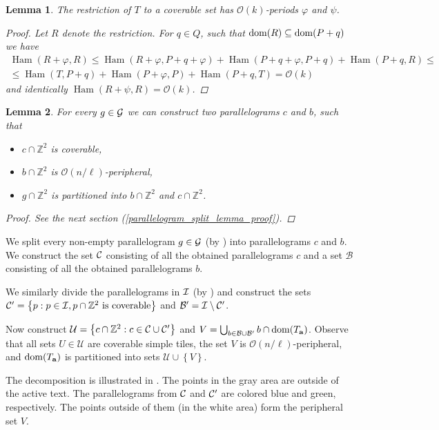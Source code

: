 \documentclass[11pt, letterpaper]{article}
\theoremstyle{plain}
\newtheorem{lemma}{Lemma}
\theoremstyle{definition}
\theoremstyle{remark}
\newcommand{\Z}{\mathbb{Z}}
\renewcommand{\O}{\mathcal{O}}
\newcommand{\U}{\mathcal{U}}
\renewcommand{\phi}{\varphi}
\newcommand{\set}[1]{\left\lbrace #1 \right\rbrace}
\newcommand{\eq}[1]{\begin{align*} #1 \end{align*}}
\DeclareMathOperator*{\Ham}{Ham}
\begin{document}
\begin{lemma}\label{coverable is periodic}
	The restriction of $T$ to a coverable set has $\O(k)$-periods $\phi$ and $\psi$.
	\begin{proof}
		Let $R$ denote the restriction. For $q \in Q$, such that $\operatorname*{dom}(R) \subseteq \operatorname*{dom}(P + q)$ we have
		\eq{
			\Ham(R + \phi, R) \le \Ham(R + \phi, P + q + \phi) + \Ham(P + q + \phi, P + q) + \Ham(P + q, R) \le \\
			\le \Ham(T, P + q) + \Ham(P + \phi, P) + \Ham(P + q, T) = \O(k)
		}
		and identically $\Ham(R + \psi, R) = \O(k)$.
	\end{proof}
\end{lemma}

\begin{lemma}\label{parallelogram_split_lemma}
	For every $g \in \mathcal{G}$ we can construct two parallelograms $c$ and $b$, such that
	\begin{itemize}
		\item $c \cap \Z^2$ is coverable,
		\item $b \cap \Z^2$ is $\O(n / \ell)$-peripheral,
		\item $g \cap \Z^2$ is partitioned into $b \cap \Z^2$ and $c \cap \Z^2$.
	\end{itemize}
	\begin{proof} See the next section (\ref{parallelogram_split_lemma_proof}). \end{proof}
\end{lemma}

\newcommand{\B}{\mathcal{B}}

We split every non-empty parallelogram $g \in \mathcal{G}$ (by ) into parallelograms $c$ and $b$.
We construct the set $\mathcal{C}$ consisting of all the obtained parallelograms $c$ and a set $\B$ consisting of all the obtained parallelograms $b$.

We similarly divide the parallelograms in $\mathcal{I}$ (by ) and construct the sets $\C' = \set{p : p \in \I, p \cap \Z^2 \text{ is coverable}}$ and $\B' = \I \setminus \C'$.

Now construct $\U = \set{c \cap \Z^2 : c \in \C \cup \C'}$ and $V = \bigcup_{b \in \B \cup \B'} b \cap \d{\Ta}$.
Observe that all sets $U \in \U$ are coverable simple tiles, the set $V$ is $\O(n / \ell)$-peripheral, and $\operatorname*{dom}(T_\mathbf{a})$ is partitioned into sets $\U \cup \set{V}$.

The decomposition is illustrated in .
The points in the gray area are outside of the active text.
The parallelograms from $\mathcal{C}$ and $\mathcal{C}'$ are colored blue and green, respectively.
The points outside of them (in the white area) form the peripheral set $V$.
\end{document}

